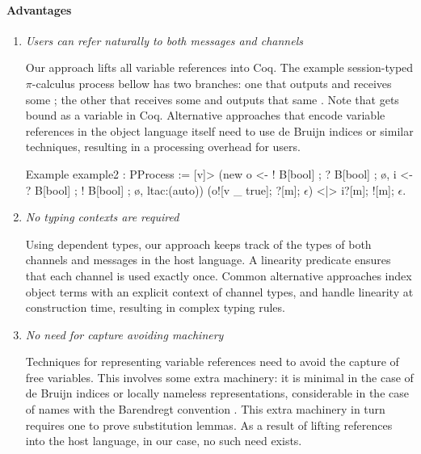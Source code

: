 \documentclass{mproj}
\newcommand{\picalc}{$\pi$-calculus}
\begin{document}
\paragraph{Advantages}
\begin{enumerate}
    \item \emph{Users can refer naturally to both messages and channels}

        Our approach lifts all variable references into Coq. The example session-typed \picalc{} process bellow has two branches: one that outputs  and receives some ; the other that receives some  and outputs that same . Note that  gets bound as a variable in Coq. Alternative approaches that encode variable references in the object language itself need to use de Bruijn indices \cite{deBruijn1972} or similar techniques, resulting in a processing overhead for users.
        
\begin{coq}
Example example2 : PProcess := [v]>
    (new o <- ! B[bool] ; ? B[bool] ; ø,
         i <- ? B[bool] ; ! B[bool] ; ø,
         ltac:(auto))
    (o![v _ true]; ?[m]; $\epsilon$) <|> i?[m]; ![m]; $\epsilon$.
\end{coq}

    \item \emph{No typing contexts are required}

        Using dependent types, our approach keeps track of the types of both channels and messages in the host language. A linearity predicate ensures that each channel is used exactly once. Common alternative approaches index object terms with an explicit context of channel types, and handle linearity at construction time, resulting in complex typing rules.

    \item \emph{No need for capture avoiding machinery}

        Techniques for representing variable references need to avoid the capture of free variables. This involves some extra machinery: it is minimal in the case of de Bruijn indices \cite{deBruijn1972} or locally nameless representations, considerable in the case of names with the Barendregt convention \cite{Barendregt1984}. This extra machinery in turn requires one to prove substitution lemmas. As a result of lifting references into the host language, in our case, no such need exists.
\end{enumerate}
\end{document}
